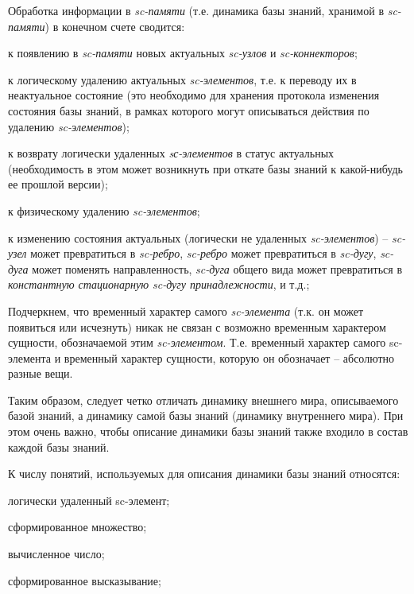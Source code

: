 Обработка информации в \textit{sc-памяти} (т.е. динамика базы знаний, хранимой в \textit{sc-памяти}) в конечном счете сводится:
\begin{textitemize}
	\item к появлению в \textit{sc-памяти} новых актуальных \textit{sc-узлов} и \textit{sc-коннекторов};
	\item к логическому удалению актуальных \textit{sc-элементов}, т.е. к переводу их в неактуальное состояние (это необходимо для хранения протокола изменения состояния базы знаний, в рамках которого могут описываться действия по удалению \textit{sc-элементов});
	\item к возврату логически удаленных \textit{sс-элементов} в статус актуальных (необходимость в этом может возникнуть при откате базы знаний к какой-нибудь ее прошлой версии);
	\item к физическому удалению \textit{sc-элементов};
	\item к изменению состояния актуальных (логически не удаленных \textit{sc-элементов}) -- \textit{sc-узел} может превратиться в \textit{sc-ребро}, \textit{sc-ребро} может превратиться в \textit{sc-дугу}, \textit{sc-дуга} может поменять направленность, \textit{sc-дуга} общего вида может превратиться в \textit{константную стационарную sc-дугу принадлежности}, и т.д.;
\end{textitemize}

Подчеркнем, что временный характер самого \textit{sc-элемента} (т.к. он может появиться или исчезнуть) никак не связан с возможно временным характером сущности, обозначаемой этим \textit{sc-элементом}. Т.е. временный характер самого sc-элемента и временный характер сущности, которую он обозначает -- абсолютно разные вещи.

Таким образом, следует четко отличать динамику внешнего мира, описываемого базой знаний, а динамику самой базы знаний (динамику внутреннего мира). При этом очень важно, чтобы описание динамики базы знаний также входило в состав каждой базы знаний.

К числу понятий, используемых для описания динамики базы знаний относятся:
\begin{textitemize}
	\item логически удаленный sc-элемент;
	\item сформированное множество;
	\item вычисленное число;
	\item сформированное высказывание;
\end{textitemize}

